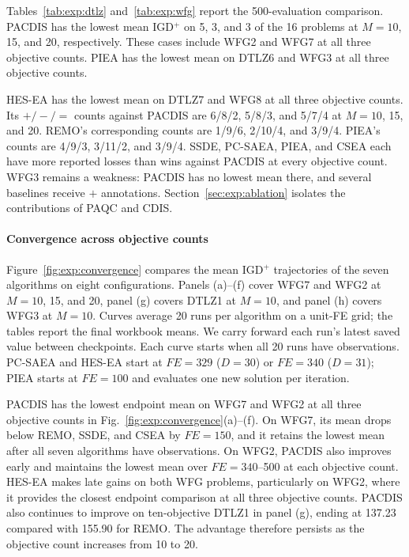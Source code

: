 \documentclass[final,5p,times,twocolumn]{elsarticle}
\begin{document}
Tables~\ref{tab:exp:dtlz} and~\ref{tab:exp:wfg} report the 500-evaluation
comparison. PACDIS has the lowest mean IGD$^+$ on 5, 3, and 3 of the 16
problems at $M=10$, 15, and 20, respectively. These cases include
WFG2 and WFG7 at all three objective counts. PIEA has the lowest mean on
DTLZ6 and WFG3 at all three objective counts.




HES-EA has the lowest mean on DTLZ7 and WFG8 at all three objective
counts. Its $+/-/=$ counts against PACDIS are 6/8/2, 5/8/3, and 5/7/4 at
$M=10$, 15, and 20. REMO's corresponding counts are 1/9/6, 2/10/4, and
3/9/4. PIEA's counts are 4/9/3, 3/11/2, and 3/9/4.
SSDE, PC-SAEA, PIEA, and CSEA each have more reported losses
than wins against PACDIS at every objective count. WFG3 remains a weakness:
PACDIS has no lowest mean there, and several baselines receive $+$ annotations.
Section~\ref{sec:exp:ablation} isolates the contributions of PAQC and CDIS.

\paragraph{Convergence across objective counts}
Figure~\ref{fig:exp:convergence} compares the mean IGD$^+$ trajectories of the
seven algorithms on eight configurations. Panels (a)--(f) cover WFG7 and WFG2
at $M=10$, 15, and 20, panel (g) covers DTLZ1 at $M=10$, and panel (h) covers
WFG3 at $M=10$.
Curves average 20 runs per algorithm on a unit-FE grid; the tables report the
final workbook means. We carry forward each run's latest saved value between
checkpoints.
Each curve starts when all 20 runs have observations.
PC-SAEA and HES-EA start
at $FE=329$ ($D=30$) or $FE=340$ ($D=31$); PIEA starts at $FE=100$ and
evaluates one new solution per iteration.

PACDIS has the lowest endpoint mean on WFG7 and WFG2 at all three objective
counts in Fig.~\ref{fig:exp:convergence}(a)--(f).
On WFG7, its mean drops below REMO, SSDE, and CSEA by $FE=150$,
and it retains the lowest mean after all seven algorithms have observations.
On WFG2, PACDIS also improves early and maintains the lowest mean over
$FE=340$--500 at each objective count.
HES-EA makes late gains on both WFG problems, particularly on WFG2,
where it provides the closest endpoint comparison at all three objective
counts. PACDIS also continues to improve on ten-objective DTLZ1 in
panel (g), ending at 137.23 compared with 155.90 for REMO.
The advantage therefore persists as the objective count increases
from 10 to 20.
\end{document}

